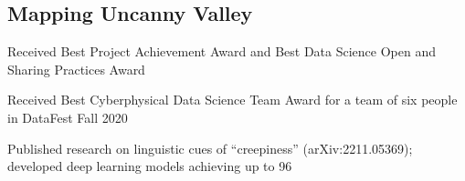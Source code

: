 \documentclass[10pt]{article}
\begin{document}
\subsection*{Mapping Uncanny Valley \hfill {}}
\noindent
\begin{asparaitem}
    \item Received Best Project Achievement Award and Best Data Science Open and
    Sharing Practices Award
    \item Received Best Cyberphysical Data Science Team Award for a team of six people
    in DataFest Fall 2020
    \item Published research on linguistic cues of “creepiness” (arXiv:2211.05369); developed deep learning models achieving up to 96%

\end{asparaitem}

\end{document}

